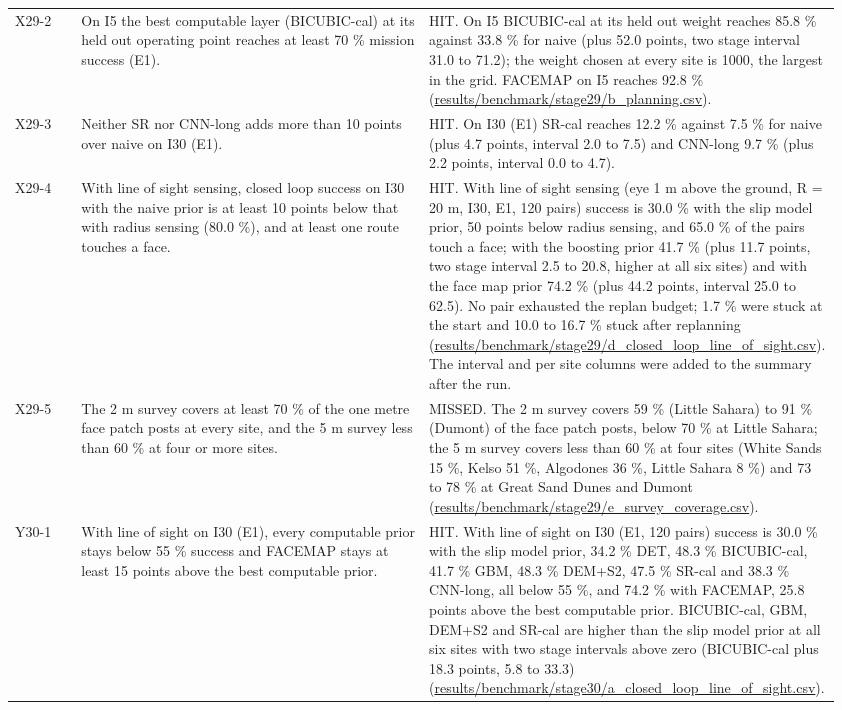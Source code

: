 \documentclass[10pt]{article}
\begin{document}
\begin{longtable}{@{}p{0.08\linewidth}p{0.42\linewidth}p{0.46\linewidth}@{}}
X29-2 & On I5 the best computable layer (BICUBIC-cal) at its held out operating point reaches at least 70 \% mission success (E1). & HIT. On I5 BICUBIC-cal at its held out weight reaches 85.8 \% against 33.8 \% for naive (plus 52.0 points, two stage interval 31.0 to 71.2); the weight chosen at every site is 1000, the largest in the grid. FACEMAP on I5 reaches 92.8 \% (\url{results/benchmark/stage29/b_planning.csv}). \\
X29-3 & Neither SR nor CNN-long adds more than 10 points over naive on I30 (E1). & HIT. On I30 (E1) SR-cal reaches 12.2 \% against 7.5 \% for naive (plus 4.7 points, interval 2.0 to 7.5) and CNN-long 9.7 \% (plus 2.2 points, interval 0.0 to 4.7). \\
X29-4 & With line of sight sensing, closed loop success on I30 with the naive prior is at least 10 points below that with radius sensing (80.0 \%), and at least one route touches a face. & HIT. With line of sight sensing (eye 1 m above the ground, R = 20 m, I30, E1, 120 pairs) success is 30.0 \% with the slip model prior, 50 points below radius sensing, and 65.0 \% of the pairs touch a face; with the boosting prior 41.7 \% (plus 11.7 points, two stage interval 2.5 to 20.8, higher at all six sites) and with the face map prior 74.2 \% (plus 44.2 points, interval 25.0 to 62.5). No pair exhausted the replan budget; 1.7 \% were stuck at the start and 10.0 to 16.7 \% stuck after replanning (\url{results/benchmark/stage29/d_closed_loop_line_of_sight.csv}). The interval and per site columns were added to the summary after the run. \\
X29-5 & The 2 m survey covers at least 70 \% of the one metre face patch posts at every site, and the 5 m survey less than 60 \% at four or more sites. & MISSED. The 2 m survey covers 59 \% (Little Sahara) to 91 \% (Dumont) of the face patch posts, below 70 \% at Little Sahara; the 5 m survey covers less than 60 \% at four sites (White Sands 15 \%, Kelso 51 \%, Algodones 36 \%, Little Sahara 8 \%) and 73 to 78 \% at Great Sand Dunes and Dumont (\url{results/benchmark/stage29/e_survey_coverage.csv}). \\
Y30-1 & With line of sight on I30 (E1), every computable prior stays below 55 \% success and FACEMAP stays at least 15 points above the best computable prior. & HIT. With line of sight on I30 (E1, 120 pairs) success is 30.0 \% with the slip model prior, 34.2 \% DET, 48.3 \% BICUBIC-cal, 41.7 \% GBM, 48.3 \% DEM+S2, 47.5 \% SR-cal and 38.3 \% CNN-long, all below 55 \%, and 74.2 \% with FACEMAP, 25.8 points above the best computable prior. BICUBIC-cal, GBM, DEM+S2 and SR-cal are higher than the slip model prior at all six sites with two stage intervals above zero (BICUBIC-cal plus 18.3 points, 5.8 to 33.3) (\url{results/benchmark/stage30/a_closed_loop_line_of_sight.csv}). \\

\end{longtable}
\end{document}
